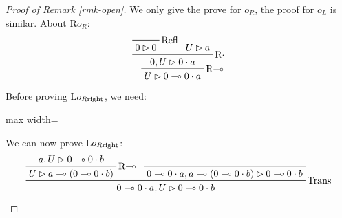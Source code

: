 \documentclass[runningheads]{llncs}
\begin{document}
\begin{proof}[Proof of Remark \ref{rmk-open}]
    We only give the prove for $o_R$, the proof for $o_L$ is similar.
    About R$o_R$:
    \[
    \prftree[r]{\textnormal{R$\multimap$}}{
        \prftree[r]{\textnormal{R$\cdot$}}{
            \prftree[r]{Refl}{0\rhd 0}
        }{
            \prfassumption{U\rhd a}
        }{0,U\rhd 0\cdot a}
    }{U\rhd 0\multimap0\cdot a}
    \]
    Before proving L$o_{R\textnormal{right}}$, we need:

    \begin{adjustbox}{max width=\textwidth}
\end{adjustbox}
    
    We can now prove L$o_{R\textnormal{right}}$:
    \[
    \prftree[r]{Trans}{
        \prftree[r]{\textnormal{R$\multimap$}}{a,U\rhd0\multimap0\cdot b}{U\rhd a\multimap(0\multimap0\cdot b)}
    }{
        \prftree{0\multimap0\cdot a,a\multimap(0\multimap0\cdot b)\rhd0\multimap0\cdot b}
    }{0\multimap 0\cdot a,U\rhd 0\multimap 0\cdot b}
    \qedhere
    \]
\end{proof}
\end{document}
